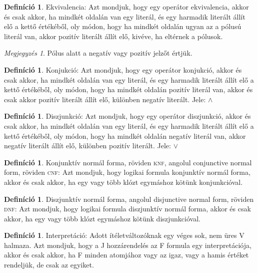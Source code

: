 \documentclass[
]{thesis-ekf}
\theoremstyle{definition}
\newtheorem{definicio}[tetel]{Definíció}
\theoremstyle{remark}
\newtheorem{megjegyzes}[tetel]{Megjegyzés}
\begin{document}
	\begin{definicio}
		Ekvivalencia: Azt mondjuk, hogy egy operátor ekvivalencia, akkor és csak akkor, ha mindkét oldalán van egy literál, és egy harmadik literált állít elő a kettő értékéből, oly módon, hogy ha mindkét oldalán ugyan az a pólusú literál van, akkor pozitív literált állít elő, kivéve, ha eltérnek a pólusok.
	\end{definicio}

	\begin{megjegyzes}
		Pólus alatt a negatív vagy pozitív jelzőt értjük.
	\end{megjegyzes}

	\begin{definicio}
		Konjukció: Azt mondjuk, hogy egy operátor konjukció, akkor és csak akkor, ha mindkét oldalán van egy literál, és egy harmadik literált állít elő a kettő értékéből, oly módon, hogy ha mindkét oldalán pozitív literál van, akkor és csak akkor pozitív literált állít elő, különben negatív literált. Jele: $\wedge$
	\end{definicio}

	\begin{definicio}
		Diszjunkció: Azt mondjuk, hogy egy operátor diszjunkció, akkor és csak akkor, ha mindkét oldalán van egy literál, és egy harmadik literált állít elő a kettő értékéből, oly módon, hogy ha mindkét oldalán negatív literál van, akkor negatív literált állít elő, különben pozitív literált. Jele: $\vee$
	\end{definicio}

	\begin{definicio}\label{cnf} %
		Konjunktív normál forma, röviden \textsc{knf}, angolul conjunctive normal form, röviden \textsc{cnf}: Azt mondjuk, hogy logikai formula konjunktív normál forma, akkor és csak akkor, ha egy vagy több klózt egymáshoz kötünk konjunkcióval.
	\end{definicio}

	\begin{definicio}\label{dnf}
		Diszjunktív normál forma, angolul disjunctive normal form, röviden \textsc{dnf}: Azt mondjuk, hogy logikai formula diszjunktív normál forma, akkor és csak akkor, ha egy vagy több klózt egymáshoz kötünk diszjunkcióval.
	\end{definicio}

	\begin{definicio}
		Interpretáció: Adott ítéletváltozóknak egy véges sok, nem üres V halmaza.
		Azt mondjuk, hogy a J hozzárendelés az F formula egy interpretációja, akkor és csak akkor, ha F minden atomjához vagy az igaz, vagy a hamis értéket rendeljük, de csak az egyiket.
	\end{definicio}
\end{document}
